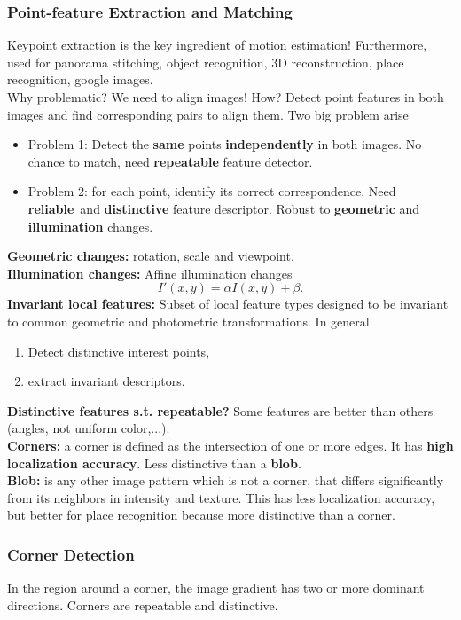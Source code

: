 \documentclass[a4paper,12 pt]{article}
\theoremstyle{definition}
\theoremstyle{remark}
\theoremstyle{definition}
\theoremstyle{definition}
\theoremstyle{definition}
\theoremstyle{remark}
\theoremstyle{definition}
\begin{document}
\subsubsection*{Point-feature Extraction and Matching}
Keypoint extraction is the key ingredient of motion estimation! Furthermore, used for panorama stitching, object recognition, 3D reconstruction, place recognition, google images. \\
Why problematic? We need to align images! How? Detect point features in both images and find corresponding pairs to align them. Two big problem arise
\begin{itemize}
\item Problem 1: Detect the \textbf{same} points \textbf{independently} in both images. No chance to match, need \textbf{repeatable} feature detector.
\item Problem 2: for each point, identify its correct correspondence. Need \textbf{reliable} and \textbf{distinctive} feature descriptor. Robust to \textbf{geometric} and \textbf{illumination} changes.
\end{itemize}
\textbf{Geometric changes:} rotation, scale and viewpoint.\\
\textbf{Illumination changes:} Affine illumination changes
\begin{equation}
I'(x,y)=\alpha I(x,y)+\beta.
\end{equation}
\textbf{Invariant local features:} Subset of local feature types designed to be invariant to common geometric and photometric transformations. In general
\begin{enumerate}
\item Detect distinctive interest points,
\item extract invariant descriptors.
\end{enumerate}
\textbf{Distinctive features s.t. repeatable?}
Some features are better than others (angles, not uniform color,...).\\
\textbf{Corners:} a corner is defined as the intersection of one or more edges. It has \textbf{high localization accuracy}. Less distinctive than a \textbf{blob}.\\
\textbf{Blob:} is any other image pattern which is not a corner, that differs significantly from its neighbors in intensity and texture. This has less localization accuracy, but better for place recognition because more distinctive than a corner.
\subsubsection*{Corner Detection}
In the region around a corner, the image gradient has two or more dominant directions. Corners are repeatable and distinctive.\\
\end{document}

